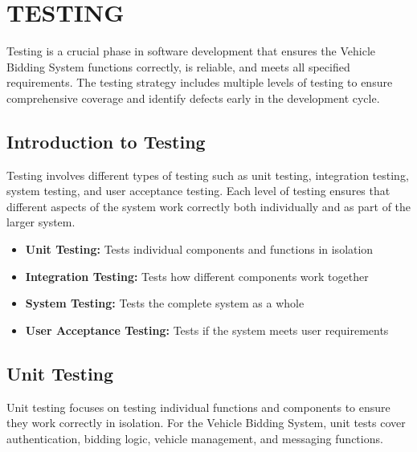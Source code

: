 \chapter{TESTING}

Testing is a crucial phase in software development that ensures the Vehicle Bidding System functions correctly, is reliable, and meets all specified requirements. The testing strategy includes multiple levels of testing to ensure comprehensive coverage and identify defects early in the development cycle.

\section{Introduction to Testing}

Testing involves different types of testing such as unit testing, integration testing, system testing, and user acceptance testing. Each level of testing ensures that different aspects of the system work correctly both individually and as part of the larger system.

\begin{itemize}
    \item \textbf{Unit Testing:} Tests individual components and functions in isolation
    \item \textbf{Integration Testing:} Tests how different components work together
    \item \textbf{System Testing:} Tests the complete system as a whole
    \item \textbf{User Acceptance Testing:} Tests if the system meets user requirements
\end{itemize}

\section{Unit Testing}

Unit testing focuses on testing individual functions and components to ensure they work correctly in isolation. For the Vehicle Bidding System, unit tests cover authentication, bidding logic, vehicle management, and messaging functions.

\renewcommand{\arraystretch}{1.5}

